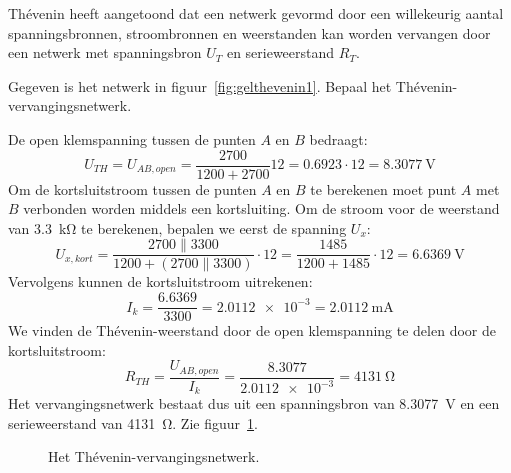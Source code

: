 Th\'evenin heeft aangetoond dat een netwerk gevormd door een willekeurig aantal spanningsbronnen,
stroombronnen en weerstanden kan worden vervangen door een netwerk met spanningsbron $U_T$ en
serieweerstand $R_T$.

\begin{example}
Gegeven is het netwerk in figuur~\ref{fig:gelthevenin1}. Bepaal het Thévenin-vervangingsnetwerk.

\begin{center}
\label{fig:gelthevenin1}
\end{center}

De open klemspanning tussen de punten $A$ en $B$ bedraagt:
%
\begin{equation}
U_{TH} = U_{AB,open} = \dfrac{2700}{1200+2700}12 = \num{0.6923}\cdot12 = \SI{8.3077}{\volt}
\end{equation}
%
Om de kortsluitstroom tussen de punten $A$ en $B$ te berekenen moet punt $A$ met $B$ verbonden worden middels een kortsluiting. Om de stroom voor de weerstand van \SI{3.3}{\kilo\ohm} te berekenen, bepalen we eerst de spanning $U_x$:
%
\begin{equation}
U_{x,kort} = \dfrac{2700\parallel3300}{1200 + (2700\parallel3300)}\cdot12 = \dfrac{1485}{1200+1485}\cdot12 = \SI{6.6369}{\volt}
\end{equation}
%
Vervolgens kunnen de kortsluitstroom uitrekenen:
%
\begin{equation}
I_k = \dfrac{\num{6.6369}}{\num{3300}} = \num{2.0112e-3} = \SI{2.0112}{\mA}
\end{equation}
%
We vinden de Thévenin-weerstand door de open klemspanning te delen door de kortsluitstroom:
%
\begin{equation}
R_{TH} = \dfrac{U_{AB,open}}{I_k} = \dfrac{\num{8.3077}}{\num{2.0112e-3}} = \SI{4131}{\ohm}
\end{equation}
%
Het vervangingsnetwerk bestaat dus uit een spanningsbron van \SI{8.3077}{\volt} en een serieweerstand van \SI{4131}{\ohm}. Zie figuur~\ref{fig:gelthevenin2}.

\begin{figure}[H]
\centering
{}
\caption{Het Thévenin-vervangingsnetwerk.}
\label{fig:gelthevenin2}
\end{figure}
\end{example}



